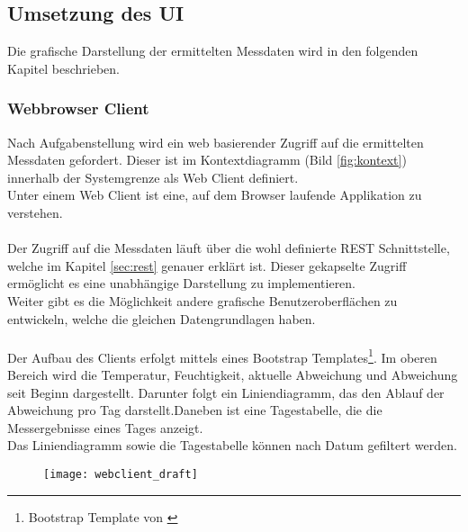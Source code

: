 \subsection{Umsetzung des UI} %
Die grafische Darstellung der ermittelten Messdaten wird in den folgenden Kapitel beschrieben.

\subsubsection{Webbrowser Client} 
Nach Aufgabenstellung wird ein web basierender Zugriff auf die ermittelten Messdaten gefordert. Dieser ist im Kontextdiagramm (Bild \ref{fig:kontext}) innerhalb der Systemgrenze als Web Client definiert.\\
Unter einem Web Client ist eine, auf dem Browser laufende Applikation zu verstehen.\\
\\
Der Zugriff auf die Messdaten läuft über die wohl definierte REST Schnittstelle, welche im Kapitel \ref{sec:rest} genauer erklärt ist. Dieser gekapselte Zugriff ermöglicht es eine unabhängige Darstellung zu implementieren.\\
Weiter gibt es die Möglichkeit andere grafische Benutzeroberflächen zu entwickeln, welche die gleichen Datengrundlagen haben.\\
\\
Der Aufbau des Clients erfolgt mittels eines Bootstrap Templates\footnote{Bootstrap Template von \cite{bootstrap}}. Im oberen Bereich wird die Temperatur, Feuchtigkeit, aktuelle Abweichung und Abweichung seit Beginn dargestellt. Darunter folgt ein Liniendiagramm, das den Ablauf der Abweichung pro Tag darstellt.Daneben ist eine Tagestabelle, die die Messergebnisse eines Tages anzeigt.\\
Das Liniendiagramm sowie die Tagestabelle können nach Datum gefiltert werden.

\begin{figure}[H]
    \centering
    \texttt{[image: webclient\_draft]}
\end{figure}